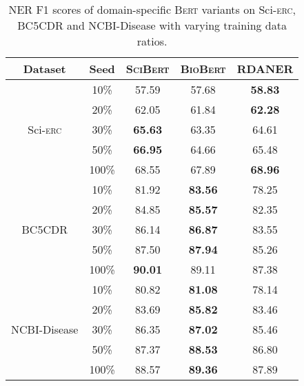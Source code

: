 \documentclass[10pt, conference, compsocconf]{IEEEtran}
\newcommand{\bert}{\textsc{Bert}\xspace}
\newcommand{\scibert}{\textsc{SciBert}\xspace}
\newcommand{\biobert}{\textsc{BioBert}\xspace}
\newcommand{\Scierc}{\textsc{S}ci-\textsc{erc}\xspace}
\newcommand{\rdaner}{\textsc{RDANER}\xspace}
\begin{document}
\begin{table}[t!]
    \caption{NER F1 scores of domain-specific \bert variants on \Scierc, BC5CDR and NCBI-Disease with 
    varying training data ratios.}\label{tal:domain-specific}
    \centering


    \begin{tabular}{c|c|ccc}
        \toprule
    Dataset  &  Seed   &  \scibert  &  \biobert   &     \rdaner   \\ \hline
                          
    \multirow{5}{*}{\Scierc}       & 10\%             & 57.59          & 57.68          & \textbf{58.83}          \\
                                  & 20\%             & 62.05          & 61.84          & \textbf{62.28}         \\
                                  & 30\%              & \textbf{65.63} & 63.35          & 64.61                  \\
                                  & 50\%                & \textbf{66.95} & 64.66          & 65.48               \\
                                  & 100\%            &  68.55          & 67.89          & \textbf{68.96}         \\ \hline
    \multirow{5}{*}{BC5CDR}       & 10\%               & 81.92          & \textbf{83.56} & 78.25                 \\
                                  & 20\%             & 84.85          & \textbf{85.57} & 82.35                 \\
                                  & 30\%              & 86.14          & \textbf{86.87} & 83.55                  \\
                                  & 50\%               & 87.50          & \textbf{87.94} &      85.26            \\
                                  & 100\%             & \textbf{90.01} & 89.11          &        87.38        \\ \hline
    \multirow{5}{*}{NCBI-Disease} & 10\%                 & 80.82          & \textbf{81.08} &       78.14             \\
                                  & 20\%               & 83.69          & \textbf{85.82} &       83.46         \\
                                  & 30\%                 & 86.35          & \textbf{87.02} &     85.46           \\
                                  & 50\%                 & 87.37          & \textbf{88.53} &   86.80       \\
                                  & 100\%                & 88.57          & \textbf{89.36} &   87.89            \\ 
    \bottomrule
    \end{tabular}
    \end{table}
\end{document}
